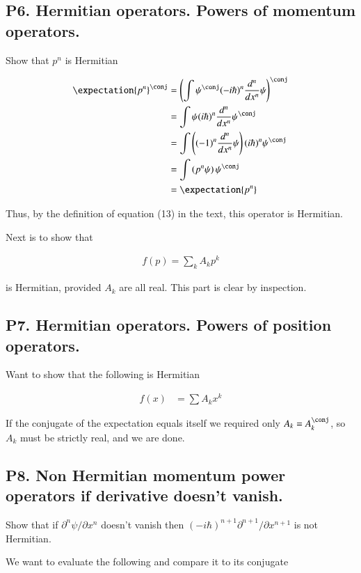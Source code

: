 \documentclass{article}
\begin{document}
\subsection{P6. Hermitian operators. Powers of momentum operators. }

Show that $p^n$ is Hermitian

\begin{align*}
\expectation{p^n}^\conj 
&=
\left( \int \psi^\conj (-i \hbar)^n \frac{d^n}{dx^n} \psi \right)^\conj \\
&=
\int \psi (i \hbar)^n \frac{d^n}{dx^n} \psi^\conj \\
&=
\int \left( (-1)^n \frac{d^n}{dx^n} \psi \right) (i \hbar)^n \psi^\conj \\
&=
\int \left( p^n \psi \right) \psi^\conj \\
&=
\expectation{p^n}
\end{align*}

Thus, by the definition of equation (13) in the text, this operator is
Hermitian.

Next is to show that 

\begin{align*}
f(p) = \sum_k A_k p^k
\end{align*}

is Hermitian, provided $A_k$ are all real.  This part is clear by inspection.

\subsection{P7. Hermitian operators. Powers of position operators. }

Want to show that the following is Hermitian

\begin{align*}
f(x) &= \sum A_k x^k
\end{align*}

If the conjugate of the expectation equals itself we required only $A_k = A_k^\conj$, so $A_k$ must be strictly real, and we are done.

\subsection{P8. Non Hermitian momentum power operators if derivative doesn't vanish. }

Show that if $\partial^n \psi/\partial x^n$ doesn't vanish then $(-i\hbar)^{n+1} \partial^{n+1}/\partial x^{n+1}$ is not Hermitian.

We want to evaluate the following and compare it to its conjugate
\end{document}
